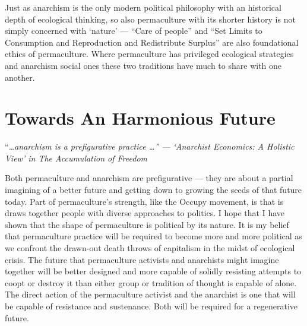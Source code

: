 \documentclass[a4paper, 11pt]{article}
\begin{document}
\begin{multicols*}{2}
Just as anarchism is the only modern political philosophy with an historical depth of ecological thinking, so also permaculture with its shorter history is not simply concerned with `nature' --- ``Care of people'' and ``Set Limits to Consumption and Reproduction and Redistribute Surplus'' are also foundational ethics of permaculture.  Where permaculture has privileged ecological strategies and anarchism social ones these two traditions have much to share with one another.

\section*{Towards An Harmonious Future}

``\em{\ldots anarchism is a \em prefigurative \em practice \ldots }\em'' --- `Anarchist Economics: A Holistic View' in \em{The Accumulation of Freedom}\em
\vspace{1mm}

Both permaculture and anarchism are prefigurative --- they are about a partial imagining of a better future and getting down to growing the seeds of that future today. Part of permaculture's strength, like the Occupy movement, is that is draws together people with diverse approaches to politics.  I hope that I have shown that the shape of permaculture is political by its nature.  It is my belief that permaculture practice will be required to become more and more political as we confront the drawn-out death throws of capitalism in the midst of ecological crisis.  The future that permaculture activists and anarchists might imagine together will be better designed and more capable of solidly resisting attempts to coopt or destroy it than either group or tradition of thought is capable of alone.  The direct action of the permaculture activist and the anarchist is one that will be capable of resistance and sustenance.  Both will be required for a regenerative future.

\begin{comment}
\begin{quote}
\begin{quote}
        ``As the capitalist mode of production enters its worst crisis since the 1930s, peasant and small farmers increasingly present a vision of autonomy, diversity, and cooperation that may just be the key elements of a necessary social and economic reorganisation.'' --- \textsc{Bello and Baviera} --- Food Wars in \textsc{Magdoff and Tokar} --- Agriculture and Food Crisis, p49
\end{quote}


\end{comment}
\end{multicols*}
\end{document}
